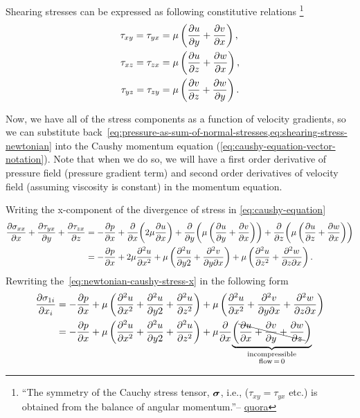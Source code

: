 Shearing stresses can be expressed as following constitutive relations%
\footnote{``The symmetry of the Cauchy stress tensor, \(\boldsymbol{\mathbf{\sigma}}\), i.e., (\(\tau_{xy} = \tau_{yx}\) etc.) is obtained from the balance of angular momentum.''--%
\href{https://www.quora.com/Why-is-the-Cauchy-stress-tensor-symmetrical-at-equilibrium}{quora}}
%
\begin{equation}
  \begin{aligned}
    \tau_{xy} = \tau_{yx} &= \mu \left( \frac{\partial u}{\partial y} + \frac{\partial v}{\partial x} \right), \\
    \tau_{xz} = \tau_{zx} &= \mu \left( \frac{\partial u}{\partial z} + \frac{\partial w}{\partial x} \right), \\
    \tau_{yz} = \tau_{zy} &= \mu \left( \frac{\partial v}{\partial z} + \frac{\partial w}{\partial y} \right).
  \end{aligned}
  \label{eq:shearing-stress-newtonian}
\end{equation}

Now, we have all of the stress components as a function of velocity gradients,
so we can substitute back~\cref{eq:pressure-as-sum-of-normal-stresses,eq:shearing-stress-newtonian} into the Caushy momentum equation (\cref{eq:caushy-equation-vector-notation}).
Note that when we do so, we will have a first order derivative of pressure field (pressure gradient term) and second order derivatives of velocity field (assuming viscosity is constant) in the momentum equation.
%

Writing the x-component of the divergence of stress in \cref{eq:caushy-equation}
%
\begin{equation}
  \begin{aligned}
  \frac{\partial \sigma_{xx}}{\partial x} + \frac{\partial \tau_{yx}}{\partial y} + \frac{\partial \tau_{zx}}{\partial z}
  &= - \frac{\partial p}{\partial x}
  + \frac{\partial }{\partial x}{\left( 2 \mu \frac{\partial u}{\partial x} \right)}
  + \frac{\partial }{\partial y}{\left( \mu \left( \frac{\partial u}{\partial y} + \frac{\partial v}{\partial x} \right) \right)}
  + \frac{\partial }{\partial z}{\left( \mu \left( \frac{\partial u}{\partial z} + \frac{\partial w}{\partial x} \right) \right)} \\
  &= - \frac{\partial p}{\partial x}
  +  2 \mu \frac{\partial^2 u}{\partial x^2}
  +  \mu \left( \frac{\partial^2 u}{\partial y2} + \frac{\partial^2 v}{\partial y \partial x} \right)
  +  \mu \left( \frac{\partial^2 u}{\partial z^2} + \frac{\partial^2 w}{\partial z \partial x} \right).
  \end{aligned}
  \label{eq:newtonian-caushy-stress-x}
\end{equation}
%
Rewriting the~\cref{eq:newtonian-caushy-stress-x} in the following form
\begin{equation}
  \begin{aligned}
  \frac{\partial \sigma_{1i}}{\partial x_i}
  &= -\frac{\partial p}{\partial x}
  + \mu \left( \frac{\partial^2 u}{\partial x^2} + \frac{\partial^2 u}{\partial y2} + \frac{\partial^2 u}{\partial z^2} \right) + \mu \left( \frac{\partial^2 u}{\partial x^2} + \frac{\partial^2 v}{\partial y \partial x} + \frac{\partial^2 w}{\partial z \partial x} \right)\\
  &= -\frac{\partial p}{\partial x}
  + \mu \left( \frac{\partial^2 u}{\partial x^2} + \frac{\partial^2 u}{\partial y2} + \frac{\partial^2 u}{\partial z^2} \right) + \mu \frac{\partial }{\partial x}{ \underbrace{\left(\bcancel{\frac{\partial u}{\partial x} + \frac{\partial v}{\partial y} + \frac{\partial w}{\partial z}}\right)}_{\substack{\text{incompressible} \\ \text{flow}\, =\, 0}} }
  \end{aligned}
  \label{eq:newtonian-caushy-stress-x-rewrite}
\end{equation}

